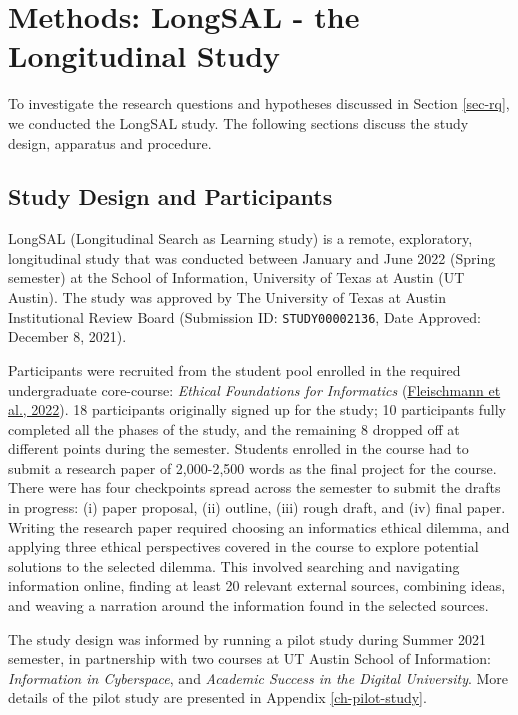 \documentclass[letterpaper, nobind]{templates/ociamthesis}
\begin{document}
\hypertarget{methods-longsal---the-longitudinal-study}{%
\chapter{Methods: LongSAL - the Longitudinal Study}\label{methods-longsal---the-longitudinal-study}}

To investigate the research questions and hypotheses discussed in Section \ref{sec-rq}, we conducted the LongSAL study.
The following sections discuss the study design, apparatus and procedure.

\hypertarget{sec-method-exp-design}{%
\section{Study Design and Participants}\label{sec-method-exp-design}}

LongSAL (Longitudinal Search as Learning study) is a remote, exploratory, longitudinal study that was conducted between January and June 2022 (Spring semester) at the School of Information, University of Texas at Austin (UT Austin).
The study was approved by The University of Texas at Austin Institutional Review Board (Submission ID: \texttt{STUDY00002136}, Date Approved: December 8, 2021).

Participants were recruited from the student pool enrolled in the required undergraduate core-course: \emph{Ethical Foundations for Informatics} (\protect\hyperlink{ref-fleischmann2022i303}{Fleischmann et al., 2022}).
18 participants originally signed up for the study; 10 participants fully completed all the phases of the study, and the remaining 8 dropped off at different points during the semester.
Students enrolled in the course had to submit a research paper of 2,000-2,500 words as the final project for the course.
There were has four checkpoints spread across the semester to submit the drafts in progress: (i) paper proposal, (ii) outline, (iii) rough draft, and (iv) final paper.
Writing the research paper required choosing an informatics ethical dilemma, and applying three ethical perspectives covered in the course to explore potential solutions to the selected dilemma.
This involved searching and navigating information online, finding at least 20 relevant external sources, combining ideas, and weaving a narration around the information found in the selected sources.

The study design was informed by running a pilot study during Summer
2021 semester, in partnership with two courses at UT Austin School of
Information: \emph{Information in Cyberspace}, and \emph{Academic Success in the
Digital University}. More details of the pilot study are presented in
Appendix \ref{ch-pilot-study}.
\end{document}
